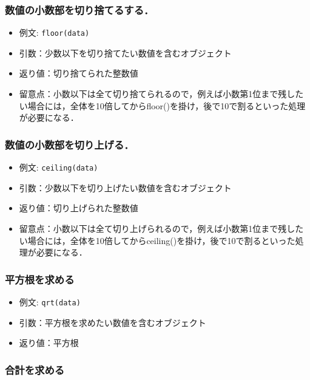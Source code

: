 \documentclass[
  xelatex, ja=standard]{bxjsarticle}
\providecommand{\tightlist}{%
  \setlength{\itemsep}{0pt}\setlength{\parskip}{0pt}}
\begin{document}
\subsubsection{数値の小数部を切り捨てるする．}\label{ux6570ux5024ux306eux5c0fux6570ux90e8ux3092ux5207ux308aux6368ux3066ux308bux3059ux308b}

\begin{itemize}
\tightlist
\item
  例文: \texttt{floor(data)}
\item
  引数：少数以下を切り捨てたい数値を含むオブジェクト
\item
  返り値：切り捨てられた整数値
\item
  留意点：小数以下は全て切り捨てられるので，例えば小数第1位まで残したい場合には，全体を10倍してからfloor()を掛け，後で10で割るといった処理が必要になる．
\end{itemize}

\subsubsection{数値の小数部を切り上げる．}\label{ux6570ux5024ux306eux5c0fux6570ux90e8ux3092ux5207ux308aux4e0aux3052ux308b}

\begin{itemize}
\tightlist
\item
  例文: \texttt{ceiling(data)}
\item
  引数：少数以下を切り上げたい数値を含むオブジェクト
\item
  返り値：切り上げられた整数値
\item
  留意点：小数以下は全て切り上げられるので，例えば小数第1位まで残したい場合には，全体を10倍してからceiling()を掛け，後で10で割るといった処理が必要になる．
\end{itemize}

\subsubsection{平方根を求める}\label{ux5e73ux65b9ux6839ux3092ux6c42ux3081ux308b}

\begin{itemize}
\tightlist
\item
  例文: \texttt{qrt(data)}
\item
  引数：平方根を求めたい数値を含むオブジェクト
\item
  返り値：平方根
\end{itemize}

\subsubsection{合計を求める}\label{ux5408ux8a08ux3092ux6c42ux3081ux308b}
\end{document}

